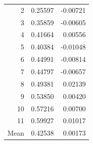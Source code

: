 \begin{table}[t]
\begin{minipage}[t]{0.47\textwidth}
\begin{tabular}{rrr}
2 & 0.25597 & -0.00721 \\
3 & 0.35859 & -0.00605 \\
4 & 0.41664 & 0.00556 \\
5 & 0.40384 & -0.01048 \\
6 & 0.44991 & -0.00814 \\
7 & 0.44797 & -0.00657 \\
8 & 0.49381 & 0.02139 \\
9 & 0.53850 & 0.00420 \\
10 & 0.57216 & 0.00700 \\
11 & 0.59927 & 0.01017 \\
\midrule
Mean & 0.42538 & 0.00173 \\
\bottomrule
\end{tabular}
\end{minipage}
\end{table}
